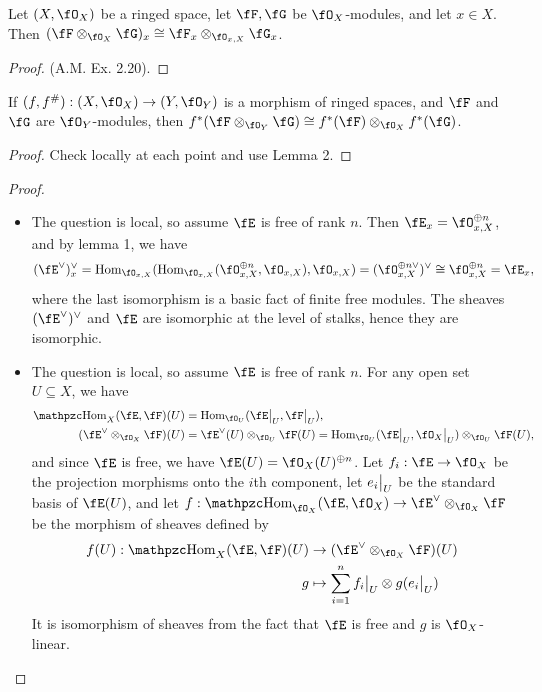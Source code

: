\documentclass[a4paper]{article}
\begin{document}
\begin{enumerate} [label=\textbf{\arabic*.}, leftmargin=0em]
\begin{lemma}
    Let $(X, \fO_X)$ be a ringed space, let $\fF, \fG$ be $\fO_X$-modules, and let $x \in X$. Then $(\fF \otimes_{\fO_X} \fG)_x \cong \fF_x \otimes_{\fO_{x, X}} \fG_x$.
\end{lemma}

\begin{proof}
    (A.M. Ex. 2.20).
\end{proof}

\begin{lemma}
    If $(f, f^\#) : (X, \fO_X) \to (Y, \fO_Y)$ is a morphism of ringed spaces, and $\fF$ and $\fG$ are $\fO_Y$-modules, then $f^*(\fF \otimes_{\fO_Y} \fG) \cong f^*(\fF) \otimes_{\fO_X} f^*(\fG)$.
\end{lemma}

\begin{proof}
    Check locally at each point and use Lemma 2.
\end{proof}

\begin{proof} $ $ \vspace{0pt}
\begin{itemize} [leftmargin=0em]
    \item[(a)] The question is local, so assume $\fE$ is free of rank $n$. Then $\fE_x = \fO_{x, X}^{\oplus n}$, and by lemma 1, we have
    \begin{align*}
        (\fE^\vee)^\vee_x = \Hom_{\fO_{x, X}}(\Hom_{\fO_{x, X}}(\fO_{x, X}^{\oplus n}, \fO_{x, X}), \fO_{x, X}) = (\fO_{x, X}^{\oplus n\vee})^\vee \cong \fO_{x, X}^{\oplus n} = \fE_x,
    \end{align*}
    where the last isomorphism is a basic fact of finite free modules. The sheaves $(\fE^\vee)^\vee$ and $\fE$ are isomorphic at the level of stalks, hence they are isomorphic.

    \item[(b)] The question is local, so assume $\fE$ is free of rank $n$. For any open set $U \subseteq X$, we have
    \begin{align*}
        \rHom_{X}(\fE, \fF)(U) & = \Hom_{\fO_U}(\restr{\fE}{U}, \restr{\fF}{U}), \\
        (\fE^\vee \otimes_{\fO_X} \fF)(U) & = \fE^\vee(U) \otimes_{\fO_U} \fF(U) = \Hom_{\fO_U}(\restr{\fE}{U}, \restr{\fO_X}{U}) \otimes_{\fO_U} \fF(U),
    \end{align*}
    and since $\fE$ is free, we have $\fE(U) = \fO_X(U)^{\oplus n}$. Let $f_i : \fE \to \fO_X$ be the projection morphisms onto the $i$th component, let $\restr{e_i}{U}$ be the standard basis of $\fE(U)$, and let $f : \rHom_{\fO_X}(\fE, \fO_X) \to \fE^\vee \otimes_{\fO_X} \fF$ be the morphism of sheaves defined by
    \begin{align*}
        f(U) : \rHom_{X}(\fE, \fF)(U) & \to (\fE^\vee \otimes_{\fO_X} \fF)(U) \\
        g & \mapsto \sum_{i = 1}^n \restr{f_i}{U} \otimes g(\restr{e_i}{U})
    \end{align*}
    It is isomorphism of sheaves from the fact that $\fE$ is free and $g$ is $\fO_X$-linear.


\end{itemize}
\end{proof}
\end{enumerate}
\end{document}
